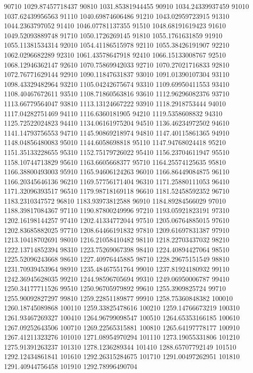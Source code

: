 {90710 1029.87457718437
90810 1031.85381944455
90910 1034.24339937459
91010 1037.62439956563
91110 1040.69874606486
91210 1043.02959723915
91310 1044.2363797052
91410 1046.07781137355
91510 1048.68191619423
91610 1049.52093889748
91710 1050.1726269145
91810 1055.1761631859
91910 1055.11381534314
92010 1054.41186515978
92110 1055.38426191907
92210 1062.0296682289
92310 1061.43578647918
92410 1066.15133008767
92510 1068.12946362147
92610 1070.75869942033
92710 1070.27021716833
92810 1072.76771629144
92910 1090.11847631837
93010 1091.01390107304
93110 1098.43329482964
93210 1105.04242675674
93310 1109.69950411553
93410 1108.40467672611
93510 1108.71860563816
93610 1112.96296082376
93710 1113.66779564047
93810 1113.13124667222
93910 1118.2918753444
94010 1117.04282751469
94110 1116.6360181905
94210 1119.5358608832
94310 1125.72522024823
94410 1134.06161975204
94510 1136.46234972502
94610 1141.14793756553
94710 1145.90869218974
94810 1147.40115861365
94910 1148.04856480083
95010 1144.6058698818
95110 1147.94768024418
95210 1151.35133228655
95310 1152.75179726022
95410 1156.23704611947
95510 1158.10744713829
95610 1163.6605668377
95710 1164.25574125635
95810 1166.38800493003
95910 1165.94606124263
96010 1166.86449084875
96110 1166.20345646136
96210 1169.57756171404
96310 1171.25880111053
96410 1171.32096393517
96510 1179.98718169118
96610 1181.52458592352
96710 1183.2310347572
96810 1183.93973812588
96910 1184.89284566029
97010 1188.39817084367
97110 1190.87800249996
97210 1193.05921823191
97310 1202.16198144257
97410 1202.41334772044
97510 1205.06764885015
97610 1202.83685882025
97710 1208.64466191832
97810 1209.61697831387
97910 1213.10418702691
98010 1216.21058410482
98110 1218.22703437032
98210 1222.13714852394
98310 1223.75269067398
98410 1224.40894427064
98510 1225.52096243668
98610 1227.40976445885
98710 1228.29675151549
98810 1231.70939453964
98910 1235.48467551764
99010 1237.81924180932
99110 1242.36945628035
99210 1244.98596705694
99310 1249.06950006787
99410 1250.34177711526
99510 1250.96705979892
99610 1255.3909825724
99710 1255.90092827297
99810 1259.22851189877
99910 1258.75360848382
100010 1260.18745089868
100110 1259.33825478616
100210 1259.14766673219
100310 1261.93467269327
100410 1264.96799098547
100510 1264.65353166185
100610 1267.09252643506
100710 1269.22565315881
100810 1265.64197778177
100910 1267.41211323276
101010 1271.08954970294
101110 1273.19055331806
101210 1275.91391263237
101310 1278.1236289344
101410 1288.65707792149
101510 1292.12434861841
101610 1292.26315284675
101710 1291.00497262951
101810 1291.40944756458
101910 1292.78996490704
}
